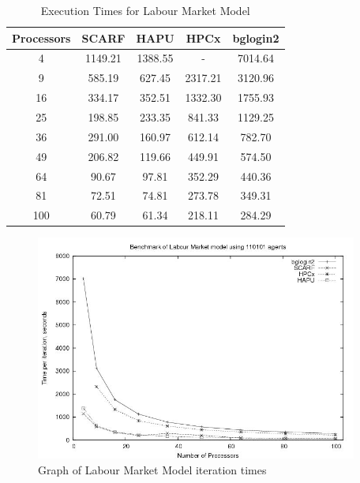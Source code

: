 {
\renewcommand{\arraystretch}{1.25}
\begin{table}[ht]
 \centering
  \begin{tabular}{c|cccc}
 Processors &SCARF &HAPU  &HPCx   &bglogin2 \\ \hline
4 &1149.21 &1388.55 &- &7014.64 \\
9 &585.19 &627.45 &2317.21 &3120.96     \\
16 &334.17 &352.51 &1332.30 &1755.93    \\
25 &198.85 &233.35 &841.33 &1129.25     \\
36 &291.00 &160.97 &612.14 &782.70      \\
49 &206.82 &119.66 &449.91 &574.50      \\
64 &90.67 &97.81 &352.29 &440.36        \\
81 &72.51 &74.81 &273.78 &349.31        \\
100 &60.79 &61.34 &218.11 &284.29       \\

 \end{tabular}
 \caption{Execution Times for Labour Market Model}
 \label{tab:ExecutionTimesForLabour}
\end{table}
}
\bigskip
\begin{figure}[ht]
 \centering
  \includegraphics[width=300pt]{Labour2-graph.jpg}
 \caption{Graph of Labour Market Model iteration times}
 \label{fig:Labour-graph1}
\end{figure}

